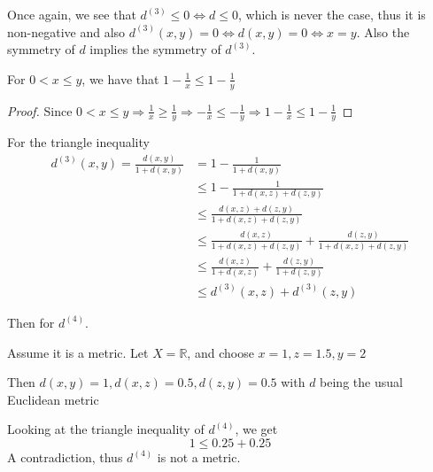 \documentclass{article}
\begin{document}
\begin{problem}
\begin{solution}
	Once again, we see that \( d^{(3)} \le 0 \iff d  \le 0 \), which is never the case, thus it is non-negative and also \( d^{(3)}(x,y) = 0 \iff d(x,y) = 0 \iff x = y  \). Also the symmetry of \( d \) implies the symmetry of \( d^{(3)} \).
	\begin{lemma}
		For \( 0 < x \le y \), we have that \( 1 - \frac{1}{x} \le 1 - \frac{1}{y} \)

		\begin{proof}
			Since \( 0 < x \le y \Rightarrow \frac{1}{x} \ge \frac{1}{y} \Rightarrow -\frac{1}{x} \le -\frac{1}{y} \Rightarrow 1 - \frac{1}{x} \le 1 - \frac{1}{y} \)
		\end{proof}
	\end{lemma}

	For the triangle inequality
	\begin{align*}
		d^{(3)}(x,y) = \frac{d(x,y)}{1+d(x,y)} & = 1- \frac{1}{1+d(x,y)}                                                     \\
		                                       & \le 1 - \frac{1}{1 + d(x,z) + d(z,y)}                                       \\
		                                       & \le \frac{d(x,z) + d(z,y)}{1 + d(x,z) + d(z,y)}                             \\
		                                       & \le \frac{d(x,z)}{1 + d(x,z) + d(z,y)} + \frac{d(z,y)}{1 + d(x,z) + d(z,y)} \\
		                                       & \le \frac{d(x,z)}{1 + d(x,z)} + \frac{d(z,y)}{1 + d(z,y)}                   \\
		                                       & \le d^{(3)}(x,z) + d^{(3)}(z,y)
	\end{align*}

	Then for \( d^{(4)} \).

	Assume it is a metric. Let \( X = \mathbb{R} \), and choose \( x = 1, z = 1.5, y = 2 \)

	Then \( d(x,y) = 1, d(x,z) = 0.5, d(z,y) = 0.5 \) with \( d \) being the usual Euclidean metric

	Looking at the triangle inequality of \( d^{(4)} \), we get
	\[
		1 \le 0.25 + 0.25
	\]
	A contradiction, thus \( d^{(4)} \) is not a metric.
\end{solution}
\end{problem}
\end{document}
